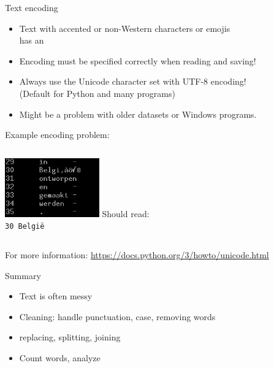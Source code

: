 \documentclass[aspectratio=169,usenames,dvipsnames]{beamer}
\begin{document}
\begin{frame}{Text encoding}
    \begin{itemize}
        \item Text with accented or non-Western characters or emojis \\
            has an 
        \item Encoding must be specified correctly when reading and saving!
        \item Always use the Unicode character set with UTF-8 encoding! \\
            (Default for Python and many programs)
        \item Might be a problem with older datasets or Windows programs.
    \end{itemize}
  
    Example encoding problem:

    \begin{columns}
    \centering
         \includegraphics[width=0.5\textwidth]{fig/encodingissue}
        Should read:\\
        \texttt{30   Belgi\"e}
        \vspace{3em}
    \end{columns}

    \vspace{1em}
    For more information: \url{https://docs.python.org/3/howto/unicode.html}
\end{frame}


\begin{frame}{Summary}
    \begin{itemize}
        \item Text is often messy
        \item Cleaning: handle punctuation, case, removing words
        \item replacing, splitting, joining
        \item Count words, analyze
    \end{itemize}
\end{frame}
\end{document}
